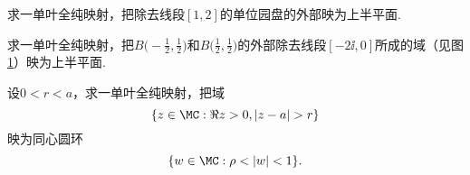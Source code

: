 \begin{xiti}
\begin{figure}[!ht]
\begin{minipage}[b]{0.48\linewidth}
\caption{\label{fig2.16}}
\end{minipage}
\end{figure}
\item 求一单叶全纯映射，把除去线段$[1,2]$的单位园盘的外部映为上半平面.
\item 求一单叶全纯映射，把$B\bigg(-\frac12,\frac12\bigg)$和$B\bigg(\frac12,\frac12\bigg)$的外部除去线段$[-2\ii,0]$所成的域（见图 \ref{fig2.16}）映为上半平面.
\item 设$0<r<a$，求一单叶全纯映射，把域
\[\{z\in\MC:\Re z>0,|z-a|>r\}\]
映为同心圆环
\[\{w\in\MC:\rho<|w|<1\}.\]
\end{xiti}
